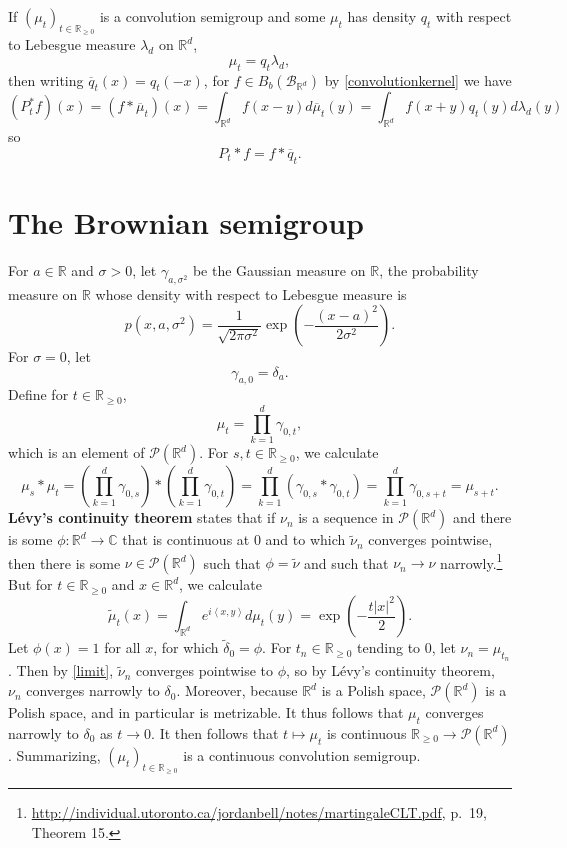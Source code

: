 \documentclass{article}
\newcommand{\inner}[2]{\left\langle #1, #2 \right\rangle}
\theoremstyle{definition}
\begin{document}
If $(\mu_t)_{t \in \mathbb{R}_{\geq 0}}$ is a convolution semigroup and
some  $\mu_t$ has density $q_t$ with respect to Lebesgue measure $\lambda_d$ on $\mathbb{R}^d$,
\[
\mu_t = q_t \lambda_d,
\]
then writing $\overline{q}_t(x) = q_t(-x)$, for $f \in B_b(\mathscr{B}_{\mathbb{R}^d})$ by \eqref{convolutionkernel} we have
\[
(P_t^*f)(x) = (f*\overline{\mu}_t)(x) = \int_{\mathbb{R}^d} f(x-y) d\overline{\mu}_t(y)
=\int_{\mathbb{R}^d} f(x+y) q_t(y) d\lambda_d(y)
\]
so
\begin{equation}
P_t*f = f*\overline{q}_t.
\label{qt}
\end{equation}

\section{The Brownian semigroup}
For $a \in \mathbb{R}$ and $\sigma>0$,
let $\gamma_{a,\sigma^2}$ be the Gaussian measure on $\mathbb{R}$, the probability measure on $\mathbb{R}$
whose density with respect to Lebesgue measure is
\[
p(x,a,\sigma^2) = \frac{1}{\sqrt{2\pi \sigma^2}} \exp\left(-\frac{(x-a)^2}{2\sigma^2}\right).
\]
For $\sigma=0$, let
\[
\gamma_{a,0} = \delta_a.
\]
Define for $t \in \mathbb{R}_{\geq 0}$,
\[
\mu_t = \prod_{k=1}^d \gamma_{0,t},
\]
which is an element of $\mathscr{P}(\mathbb{R}^d)$. 
For $s,t  \in \mathbb{R}_{\geq 0}$, we calculate
\[
\mu_s * \mu_t =  \left(\prod_{k=1}^d \gamma_{0,s}\right) * \left( \prod_{k=1}^d \gamma_{0,t} \right) 
=\prod_{k=1}^d (\gamma_{0,s} * \gamma_{0,t})
=\prod_{k=1}^d \gamma_{0,s+t}
=\mu_{s+t}.
\]
\textbf{L\'evy's continuity theorem} states that if $\nu_n$ is a sequence in $\mathscr{P}(\mathbb{R}^d)$
and there is some $\phi:\mathbb{R}^d \to \mathbb{C}$ that is continuous at $0$
and  to which $\tilde{\nu}_n$ converges pointwise, then there is some $\nu \in \mathscr{P}(\mathbb{R}^d)$ such that
$\phi = \tilde{\nu}$ and such that $\nu_n \to \nu$ narrowly.\footnote{\url{http://individual.utoronto.ca/jordanbell/notes/martingaleCLT.pdf},
p.~19, Theorem 15.}
But for $t \in \mathbb{R}_{\geq 0}$ and $x \in \mathbb{R}^d$, we calculate 
\begin{equation}
\tilde{\mu}_t(x) = \int_{\mathbb{R}^d} e^{i\inner{x}{y}} d\mu_t(y)
=\exp\left(-\frac{t|x|^2}{2}\right).
\label{limit}
\end{equation}
Let $\phi(x)=1$ for all $x$, for which $\tilde{\delta}_0=\phi$.
For $t_n \in \mathbb{R}_{\geq 0}$ tending to $0$, let
$\nu_n = \mu_{t_n}$. Then by \eqref{limit}, $\tilde{\nu}_n$ converges pointwise to $\phi$, so  by L\'evy's continuity theorem,
$\nu_n$ converges narrowly to $\delta_0$. 
Moreover, because $\mathbb{R}^d$ is a Polish space, $\mathscr{P}(\mathbb{R}^d)$ is a Polish space, and in particular
is metrizable. It thus follows that
$\mu_t$ converges narrowly to $\delta_0$ as $t \to 0$.
It then follows   that $t \mapsto \mu_t$ is continuous $\mathbb{R}_{\geq 0} \to \mathscr{P}(\mathbb{R}^d)$. 
Summarizing, $(\mu_t)_{t \in \mathbb{R}_{\geq 0}}$ is a continuous convolution semigroup.
\end{document}
